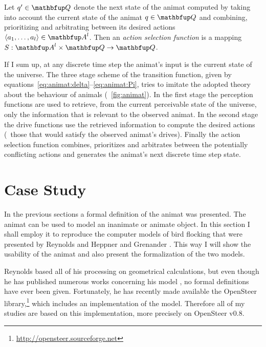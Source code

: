 \begin{definition}
\label{def:animat:S}
Let $q' \in \set{Q}$ denote the next state of the animat computed by taking into account the current state of the animat $q \in \set{Q}$ and combining, prioritizing and arbitrating between its desired actions $\langle a_1,\ldots,a_l\rangle \in \set{A}^l$. Then an \emph{action selection function} is a mapping $S: \set{A}^l \times \set{Q} \rightarrow \set{Q}$.
\end{definition}

If I sum up, at any discrete time step the animat's input is the current state of the universe. The three stage scheme of the transition function, given by equations~\eqref{eq:animat:delta}--\eqref{eq:animat:Pi}, tries to imitate the adopted theory about the behaviour of animals (\fig~\ref{fig:animat}). In the first stage the perception functions are used to retrieve, from the current perceivable state of the universe, only the information that is relevant to the observed animat. In the second stage the drive functions use the retrieved information to compute the desired actions (\ie\ those that would satisfy the observed animat's drives). Finally the action selection function combines, prioritizes and arbitrates between the potentially conflicting actions and generates the animat's next discrete time step state. 

\section{Case Study}
In the previous sections a formal definition of the animat was  presented. The animat can be used to model an inanimate or animate object. In this section I shall employ it to reproduce the computer models of bird flocking that were presented by Reynolds \cite{reynolds:1987} and Heppner and Grenander \cite{heppner:1990}. This way I will show the usability of the animat and also present the formalization of the two models. 

Reynolds based all of his processing on geometrical calculations, but even though he has published numerous works concerning his model \cite{reynolds:1987,reynolds:1993a,reynolds:1993b,reynolds:1994,reynolds:1999,reynolds:2000}, no formal definitions have ever been given. Fortunately, he has recently made available the OpenSteer library,\footnote{\href{http://opensteer.sourceforge.net}{http://opensteer.sourceforge.net}} which includes an implementation of the model. Therefore all of my studies are based on this implementation, more precisely on OpenSteer v0.8.

